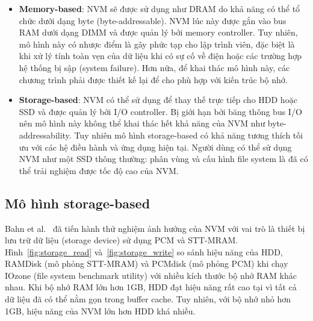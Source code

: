 \begin{itemize}
    \item \textbf{Memory-based}: NVM sẽ được sử dụng như DRAM do khả năng có thể
    tổ chức dưới dạng byte (byte-addressable). NVM lúc này được gắn vào bus RAM
    dưới dạng DIMM và được quản lý bởi memory controller. Tuy nhiên, mô hình này
    có nhược điểm là gây phức tạp cho lập trình viên, đặc biệt là khi xử lý tính
    toàn vẹn của dữ liệu khi có sự cố về điện hoặc các trường hợp hệ thống bị
    sập (system failure). Hơn nữa, để khai thác mô hình này, các chương trình
    phải được thiết kế lại để cho phù hợp với kiến trúc bộ nhớ.

    \item \textbf{Storage-based}: NVM có thể sử dụng để thay thế trực tiếp cho
    HDD hoặc SSD và được quản lý bởi I/O controller. Bị giới hạn bởi băng thông
    bus I/O nên mô hình này không thể khai thác hết khả năng của NVM như
    byte-addressability. Tuy nhiên mô hình storage-based có khả năng tương thích
    tối ưu với các hệ điều hành và ứng dụng hiện tại. Người dùng có thể sử dụng
    NVM như một SSD thông thường: phân vùng và cấu hình file system là đã có thể
    trải nghiệm được tốc độ cao của NVM.

\end{itemize}

\subsection{Mô hình storage-based}



Bahn et al.~\cite{bahnImplicationsNVMBased2020} đã tiến hành thử nghiệm ảnh
hưởng của NVM với vai trò là thiết bị lưu trữ dữ liệu (storage device) sử dụng
PCM và STT-MRAM. Hình~\ref{fig:storage_read} và~\ref{fig:storage_write} so sánh
hiệu năng của HDD, RAMDisk (mô phỏng STT-MRAM) và PCMdisk (mô phỏng PCM) khi
chạy IOzone (file system benchmark utility) với nhiều kích thước bộ nhớ RAM khác
nhau. Khi bộ nhớ RAM lớn hơn 1GB, HDD đạt hiệu năng rất cao tại vì tất cả dữ
liệu đã có thể nằm gọn trong buffer cache. Tuy nhiên, với bộ nhớ nhỏ hơn 1GB,
hiệu năng của NVM lớn hơn HDD khá nhiều.



